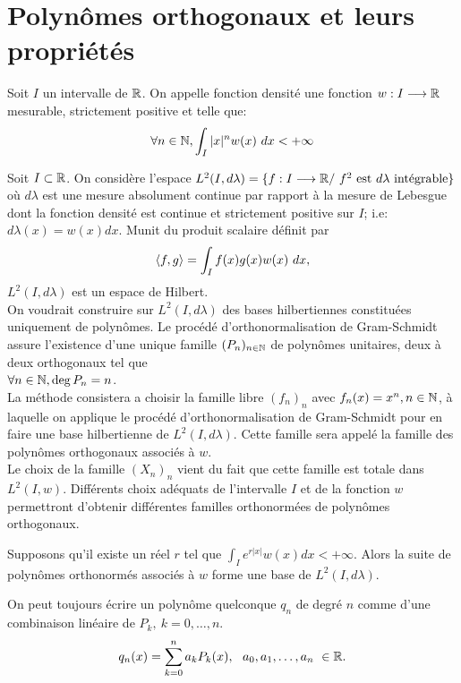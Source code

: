\section{Polynômes orthogonaux et leurs propriétés}

\bdfn
$ $\\
Soit $I$ un intervalle de $\mathbb R$. On appelle fonction densité une fonction $w:I \longrightarrow \mathbb R$ mesurable, strictement positive et telle que: $$\forall n \in \mathbb N, \int_I{|x|^n w(x)\ dx} < +\infty $$
\edfn

$ $\\Soit $ I \subset \mathbb R $. On considère l'espace $L^2(I,d \lambda)=\{f:I \longrightarrow \mathbb R / \ f^2 \  \text{est}\ d \lambda \ \text{intégrable} \}$ où $d \lambda $ est une mesure absolument continue par rapport à la mesure de Lebesgue dont la fonction densité est continue et strictement positive sur $I$; i.e: $ d \lambda (x) = w(x)dx $. Munit du produit scalaire définit par $$ \langle f,g \rangle = \int_I{f(x)g(x) w(x) \ dx}, $$ $ L^2(I,d\lambda) $ est un espace de Hilbert.
\\On voudrait construire sur $L^2(I,d\lambda)$ des bases hilbertiennes constituées uniquement de polynômes. Le procédé d'orthonormalisation de Gram-Schmidt assure l'existence d'une unique famille $ (P_n)_{n \in \mathbb N }$ de polynômes unitaires, deux à deux orthogonaux tel que \\$ \forall n \in \mathbb N, \deg{P_n} = n $.
\\La méthode consistera a choisir la famille libre $(f_n)_n$ avec $f_n(x)=x^n, n \in \mathbb N$, à laquelle on applique le procédé d'orthonormalisation de Gram-Schmidt pour en faire une base hilbertienne de $L^2(I,d\lambda)$.  Cette famille sera appelé la famille des polynômes orthogonaux associés à $w$.
\\Le choix de la famille $(X_n)_n$ vient du fait que cette famille est totale dans $L^2(I,w)$. Différents choix adéquats de l'intervalle $I$ et de la fonction $w$ permettront d'obtenir différentes familles orthonormées de polynômes orthogonaux.

\bthm
$ $\\
Supposons qu'il existe un réel $r$ tel que $\displaystyle{\int_I{e^{r |x|}w(x)dx}<+\infty}$. Alors la suite de polynômes orthonormés associés à $w$ forme une base de $L^2(I,d\lambda)$.
\ethm

\bprop
$ $\\
On peut toujours écrire un polynôme quelconque $ q_n $ de degré $n$ comme d'une combinaison linéaire de $P_k,\ k=0,\dots,n$. $$q_n(x)=\sum\limits_{k=0}^n a_k P_k(x),\ \ a_0,a_1,\dots,a_n \ \in \R.$$
\eprop

